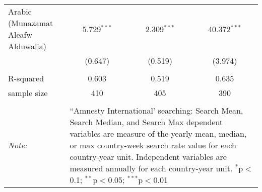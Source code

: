 \begin{table}[!htbp]
\begin{tabular}{@{\extracolsep{5pt}}lccc}
  Arabic (Munazamat Aleafw Alduwalia) & 5.729$^{***}$ & 2.309$^{***}$ & 40.372$^{***}$ \\ 
  & (0.647) & (0.519) & (3.974) \\ 
 \hline \\[-1.8ex] 
R-squared  & 0.603 & 0.519 & 0.635 \\ 
sample size  & 410 & 405 & 390 \\ 
\hline 
\hline \\[-1.8ex] 
\textit{Note:}  & \multicolumn{3}{l}{\parbox[t]{8cm}{``Amnesty International' searching: Search Mean, Search Median, and Search Max dependent variables are measure of the yearly mean, median, or max country-week search rate value for each country-year unit. Independent variables are measured annually for each country-year unit. $^{*}$p$<$0.1; $^{**}$p$<$0.05; $^{***}$p$<$0.01}} \\ 
\end{tabular} 
\end{table} 
